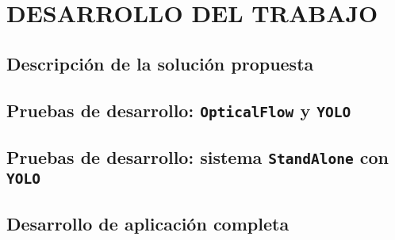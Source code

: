 \section{DESARROLLO DEL TRABAJO}

\subsection{Descripción de la solución propuesta}

\subsection{Pruebas de desarrollo: \texttt{OpticalFlow} y \texttt{YOLO}}

\subsection{Pruebas de desarrollo: sistema \texttt{StandAlone} con \texttt{YOLO}}

\subsection{Desarrollo de aplicación completa}